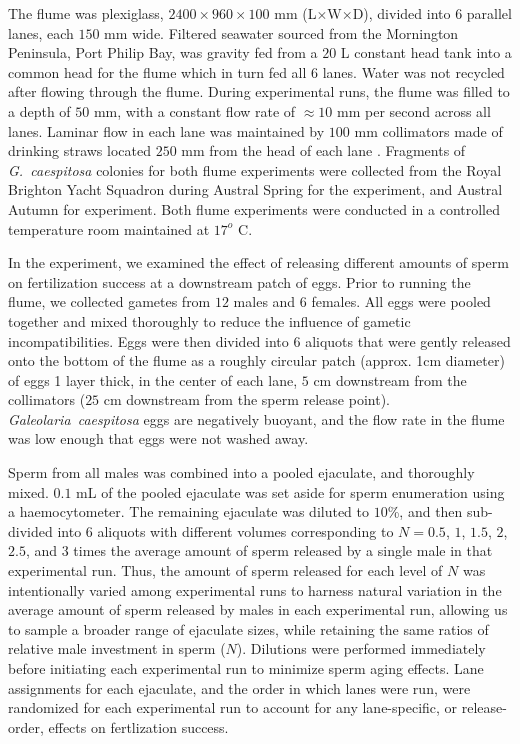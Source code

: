 \documentclass{article}
\begin{document}
	The flume was plexiglass, $2400 \times 960 \times 100$ mm (L$\times$W$\times$D), divided into $6$ parallel lanes, each $150$ mm wide. Filtered seawater sourced from the Mornington Peninsula, Port Philip Bay, was gravity fed from a $20$ L constant head tank into a common head for the flume which in turn fed all $6$ lanes. Water was not recycled after flowing through the flume. During experimental runs, the flume was filled to a depth of $50$ mm, with a constant flow rate of $\approx 10$ mm per second across all lanes. Laminar flow in each lane was maintained by $100$ mm collimators made of drinking straws located $250$ mm from the head of each lane \citep{YundMeidel2003}. Fragments of \textit{G.~caespitosa} colonies for both flume experiments were collected from the Royal Brighton Yacht Squadron during Austral Spring for the  experiment, and Austral Autumn for  experiment. Both flume experiments were conducted in a controlled temperature room maintained at $17^o$ C.

	In the  experiment, we examined the effect of releasing different amounts of sperm on fertilization success at a downstream patch of eggs. Prior to running the flume, we collected gametes from $12$ males and $6$ females. All eggs were pooled together and mixed thoroughly to reduce the influence of gametic incompatibilities. Eggs were then divided into $6$ aliquots that were gently released onto the bottom of the flume as a roughly circular patch (approx. 1cm diameter) of eggs 1 layer thick, in the center of each lane, $5$ cm downstream from the collimators ($25$ cm downstream from the sperm release point). \textit{Galeolaria~caespitosa} eggs are negatively buoyant, and the flow rate in the flume was low enough that eggs were not washed away. 

	Sperm from all males was combined into a pooled ejaculate, and thoroughly mixed. $0.1$ mL of the pooled ejaculate was set aside for sperm enumeration using a haemocytometer. The remaining ejaculate was diluted to $10$\%, and then sub-divided into $6$ aliquots with different volumes corresponding to $N = 0.5$, $1$, $1.5$, $2$, $2.5$, and $3$ times the average amount of sperm released by a single male in that experimental run. Thus, the amount of sperm released for each level of $N$ was intentionally varied among experimental runs to harness natural variation in the average amount of sperm released by males in each experimental run, allowing us to sample a broader range of ejaculate sizes, while retaining the same ratios of relative male investment in sperm ($N$). Dilutions were performed immediately before initiating each experimental run to minimize sperm aging effects. Lane assignments for each ejaculate, and the order in which lanes were run, were randomized for each experimental run to account for any lane-specific, or release-order, effects on fertlization success. 
\end{document}
